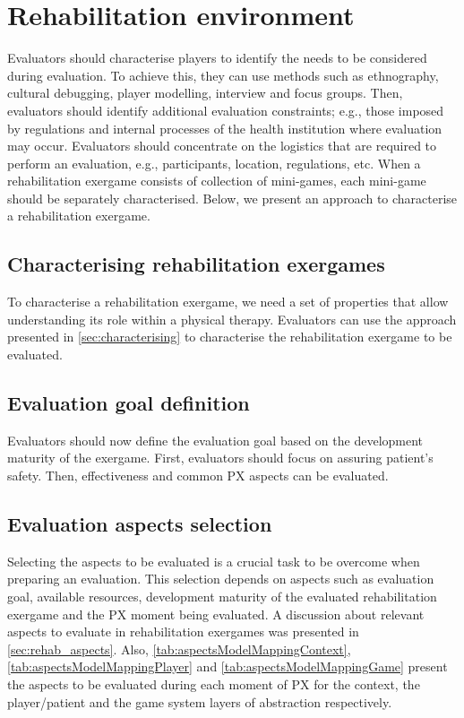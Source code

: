 

\section{Rehabilitation environment}
Evaluators should characterise players to identify the needs to be considered during evaluation. To achieve this, they can use methods such as ethnography, cultural debugging, player modelling, interview and focus groups. Then, evaluators should identify additional evaluation constraints; e.g., those imposed by regulations and internal processes of the health institution where evaluation may occur. Evaluators should concentrate on the logistics that are required to perform an evaluation, e.g., participants, location, regulations, etc. When a rehabilitation exergame consists of collection of mini-games, each mini-game should be separately characterised. Below, we present an approach to characterise a rehabilitation exergame.

\subsection{Characterising rehabilitation exergames}
To characterise a rehabilitation exergame, we need a set of properties that allow understanding its role within a physical therapy. Evaluators can use the approach presented in \autoref{sec:characterising} to characterise the rehabilitation exergame to be evaluated.

\subsection{Evaluation goal definition}
Evaluators should now define the evaluation goal based on the development maturity of the exergame. First, evaluators should focus on assuring patient’s safety. Then, effectiveness and common \ac{PX} aspects can be evaluated. 

\subsection{Evaluation aspects selection}
Selecting the aspects to be evaluated is a crucial task to be overcome when preparing an evaluation. This selection depends on aspects such as evaluation goal, available resources, development maturity of the evaluated rehabilitation exergame and the \ac{PX} moment being evaluated. A discussion about relevant aspects to evaluate in rehabilitation exergames was presented in \autoref{sec:rehab_aspects}. Also, \autoref{tab:aspectsModelMappingContext}, \autoref{tab:aspectsModelMappingPlayer} and \autoref{tab:aspectsModelMappingGame} present the aspects to be evaluated during each moment of \ac{PX} for the context, the player/patient and the game system layers of abstraction respectively.

